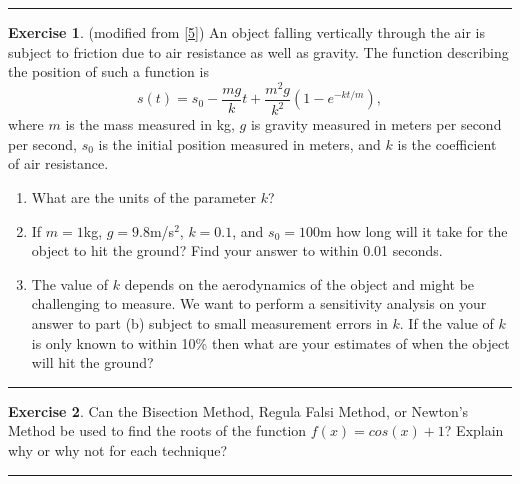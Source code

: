 \documentclass[
]{book}
\theoremstyle{definition}
\theoremstyle{definition}
\theoremstyle{definition}
\newtheorem{exercise}{Exercise}[chapter]
\theoremstyle{remark}
\begin{document}
\begin{center}\rule{0.5\linewidth}{0.5pt}\end{center}

\begin{exercise}
\protect\hypertarget{exr:unnamed-chunk-126}{}{\label{exr:unnamed-chunk-126} }(modified from {[}\protect\hyperlink{ref-burden}{5}{]}) An object falling vertically through the air is subject to friction due
to air resistance as well as gravity. The function describing the
position of such a function is
\[s(t) = s_0 - \frac{mg}{k} t + \frac{m^2 g}{k^2}\left( 1- e^{-kt/m} \right),\]
where \(m\) is the mass measured in kg, \(g\) is gravity measured in meters
per second per second, \(s_0\) is the initial position measured in meters,
and \(k\) is the coefficient of air resistance.

\begin{enumerate}
\def\labelenumi{\alph{enumi}.}
\item
  What are the units of the parameter \(k\)?
\item
  If \(m = 1\)kg, \(g=9.8\)m/s\(^2\), \(k=0.1\), and \(s_0 = 100\)m how long
  will it take for the object to hit the ground? Find your answer to
  within 0.01 seconds.
\item
  The value of \(k\) depends on the aerodynamics of the object and might
  be challenging to measure. We want to perform a sensitivity analysis
  on your answer to part (b) subject to small measurement errors in
  \(k\). If the value of \(k\) is only known to within 10\% then what are
  your estimates of when the object will hit the ground?
\end{enumerate}
\end{exercise}

\begin{center}\rule{0.5\linewidth}{0.5pt}\end{center}

\begin{exercise}
\protect\hypertarget{exr:unnamed-chunk-127}{}{\label{exr:unnamed-chunk-127} }Can the Bisection Method, Regula Falsi Method, or Newton's Method be used to find the roots of the function \(f(x) = cos(x) + 1\)? Explain why or why not for each technique?
\end{exercise}

\begin{center}\rule{0.5\linewidth}{0.5pt}\end{center}
\end{document}
